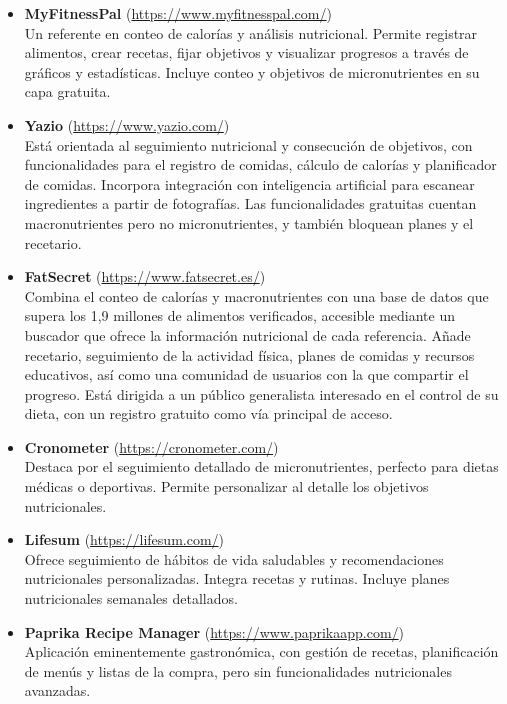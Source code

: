 \begin{itemize}
	\item \textbf{MyFitnessPal} (\url{https://www.myfitnesspal.com/})\\
	      Un referente en conteo de calorías y análisis nutricional. Permite registrar alimentos, crear recetas, fijar objetivos y visualizar progresos a través de gráficos y estadísticas. Incluye conteo y objetivos de micronutrientes en su capa gratuita.

	\item \textbf{Yazio} (\url{https://www.yazio.com/})\\
	      Está orientada al seguimiento nutricional y consecución de objetivos, con funcionalidades para el registro de comidas, cálculo de calorías y planificador de comidas. Incorpora integración con inteligencia artificial para escanear ingredientes a partir de fotografías. Las funcionalidades gratuitas cuentan macronutrientes pero no micronutrientes, y también bloquean planes y el recetario.

	\item \textbf{FatSecret} (\url{https://www.fatsecret.es/})\\
	      Combina el conteo de calorías y macronutrientes con una base de datos que supera los 1,9 millones de alimentos verificados, accesible mediante un buscador que ofrece la información nutricional de cada referencia. Añade recetario, seguimiento de la actividad física, planes de comidas y recursos educativos, así como una comunidad de usuarios con la que compartir el progreso. Está dirigida a un público generalista interesado en el control de su dieta, con un registro gratuito como vía principal de acceso.

	\item \textbf{Cronometer} (\url{https://cronometer.com/})\\
	      Destaca por el seguimiento detallado de micronutrientes, perfecto para dietas médicas o deportivas. Permite personalizar al detalle los objetivos nutricionales.

	\item \textbf{Lifesum} (\url{https://lifesum.com/})\\
	      Ofrece seguimiento de hábitos de vida saludables y recomendaciones nutricionales personalizadas. Integra recetas y rutinas. Incluye planes nutricionales semanales detallados.

	\item \textbf{Paprika Recipe Manager} (\url{https://www.paprikaapp.com/})\\
	      Aplicación eminentemente gastronómica, con gestión de recetas, planificación de menús y listas de la compra, pero sin funcionalidades nutricionales avanzadas.


\end{itemize}
